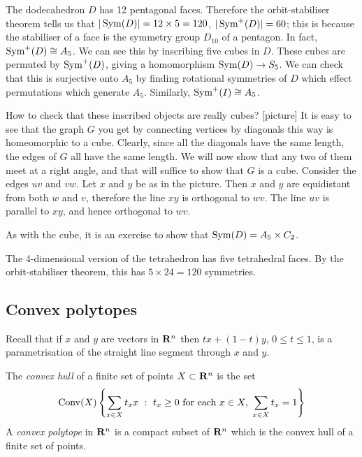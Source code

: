 \documentclass[12pt]{article}
\begin{document}
\begin{exm}
  The dodecahedron $D$ has 12 pentagonal faces. Therefore the orbit-stabiliser theorem tells us that $|\operatorname{Sym}(D)|=12\times 5=120$, $|\operatorname{Sym}^+(D)|=60$; this is because the stabiliser of a face is the symmetry group $D_{10}$ of a pentagon. In fact, $\operatorname{Sym}^+(D)\cong A_5$. We can see this by inscribing five cubes in $D$. These cubes are permuted by $\operatorname{Sym}^+(D)$, giving a homomorphism $\operatorname{Sym}(D)\to S_5$. We can check that this is surjective onto $A_5$ by finding rotational symmetries of $D$ which effect permutations which generate $A_5$. Similarly, $\operatorname{Sym}^+(I)\cong A_5$.

  How to check that these inscribed objects are really cubes? [picture] It is easy to see that the graph $G$ you get by connecting vertices by diagonals this way is homeomorphic to a cube. Clearly, since all the diagonals have the same length, the edges of $G$ all have the same length. We will now show that any two of them meet at a right angle, and that will suffice to show that $G$ is a cube. Consider the edges $uv$ and $vw$. Let $x$ and $y$ be as in the picture. Then $x$ and $y$ are equidistant from both $w$ and $v$, therefore the line $xy$ is orthogonal to $wv$. The line $uv$ is parallel to $xy$, and hence orthogonal to $wv$.
\end{exm}

\begin{rmk}
  As with the cube, it is an exercise to show that $\operatorname{Sym}(D)=A_5\times C_2$.
\end{rmk}

\begin{exm}
The 4-dimensional version of the tetrahedron has five tetrahedral faces. By the orbit-stabiliser theorem, this has $5\times 24=120$ symmetries.
\end{exm}

\subsection{Convex polytopes}

Recall that if $x$ and $y$ are vectors in $\mathbf{R}^n$ then $tx+(1-t)y$, $0\leq t\leq 1$, is a parametrisation of the straight line segment through $x$ and $y$.

\begin{dfn}
  The {\em convex hull} of a finite set of points $X\subset\mathbf{R}^n$ is the set
  \[\operatorname{Conv}(X)\left\{\sum_{x\in X}t_xx\ :\ t_x\geq 0\mbox{ for each }x\in X,\ \sum_{x\in X}t_x=1\right\}\]
    A {\em convex polytope} in $\mathbf{R}^n$ is a compact subset of $\mathbf{R}^n$ which is the convex hull of a finite set of points.
\end{dfn}
\end{document}

